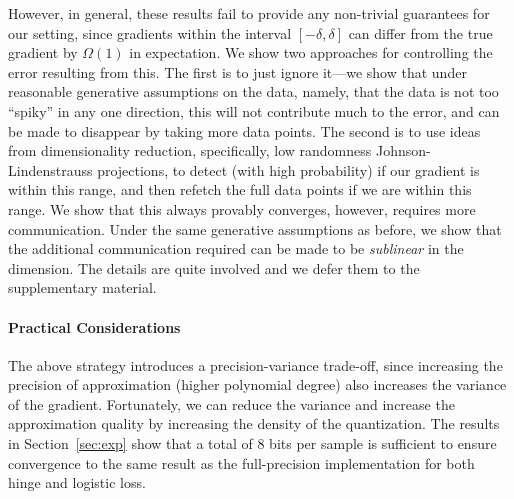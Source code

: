 However, in general, these results fail to provide any non-trivial guarantees for our setting, since gradients within the interval $[-\delta, \delta]$ can differ from the true gradient by $\Omega (1)$ in expectation.
We show two approaches for controlling the error resulting from this.
The first is to just ignore it---we show that under reasonable generative assumptions on the data, namely, that the data is not too ``spiky'' in any one direction, this will not contribute much to the error, and can be made to disappear by taking more data points.
The second is to use ideas from dimensionality reduction, specifically, low randomness Johnson-Lindenstrauss projections, to detect (with high probability) if our gradient is within this range, and then refetch the full data points if we are within this range.
We show that this always provably converges, however, requires more communication.
Under the same generative assumptions as before, we show that the additional communication required can be made to be \emph{sublinear} in the dimension.
The details are quite involved and we defer them to the supplementary material.

\iffalse
Figure~\ref{fig:approximation} shows how close the Chebyshev polynomial aprroximations with different degrees are to those two kind of functions.

\begin{figure}[h]
\centering
    \begin{subfigure}[h]{.4\columnwidth}
    \texttt{[image: micro-experiments/chebyshev\_sgn]} 
    \caption{sign function}
    \end{subfigure}
    \begin{subfigure}[h]{.4\columnwidth}
    \texttt{[image: micro-experiments/chebyshev\_sigmoid]} 
    \caption{sigmoid function}
    \end{subfigure}
\caption{Chebyshev approximation to gradient of hinge loss and logistic loss with different degrees}
\label{fig:approximation}
\end{figure} 
\fi

\vspace{-0.5em}
\paragraph{Practical Considerations} The above strategy introduces a precision-variance trade-off, since increasing the precision of approximation (higher polynomial degree) also increases the variance of the gradient. 
Fortunately, we can reduce the variance and increase the approximation quality by increasing the density of the quantization. 
The results in Section~\ref{sec:exp} show that a total of $8$ bits per sample is sufficient to ensure convergence to the same result as the full-precision 
implementation for both hinge and logistic loss. 

